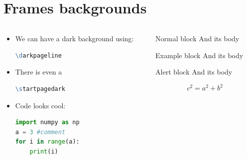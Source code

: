 \documentclass[aspectratio=169,11pt]{beamer}
\begin{document}
\section{Frames backgrounds}
\darkpageline
\begin{frame}[fragile]{\insertsection}
\begin{columns}
\begin{column}{0.5\textwidth}
    \begin{itemize}
        \item We can have a dark background using: 
        \begin{lstlisting}[language=tcl,numbers=none]
\darkpageline\end{lstlisting}
        \item There is even a 
        \begin{lstlisting}[language=tcl,numbers=none]
\startpagedark\end{lstlisting}
    \item Code looks cool:
        \begin{lstlisting}[language=Python]
import numpy as np
a = 3 #comment
for i in range(a):
    print(i)\end{lstlisting}
    \end{itemize}
    \end{column}

\begin{column}{0.5\textwidth}
    \begin{block}{Normal block}
    And its body
    \end{block}
    \begin{exampleblock}{Example block}
    And its body
    \end{exampleblock}
    \begin{alertblock}{Alert block}
    And its body
    \end{alertblock}
    \begin{equation}
        c^2 = a^2 + b^2
    \end{equation}
    \end{column}
    \end{columns}
\end{frame}
\startpagedark
\begin{frame}
    \maketitle
\end{frame}
\end{document}
